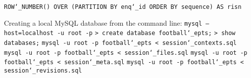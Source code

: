 \texttt{ROW\char`_NUMBER() OVER (PARTITION BY enq\char`_id ORDER BY sequence) AS risn}

\vspace{\baselineskip}
Creating a local MySQL database from the command line:\newline
\texttt{mysql --host=localhost -u root -p}\newline
\texttt{> create database football\char`_epts;}\newline
\texttt{> show databases;}\newline\newline
\texttt{mysql -u root -p football\char`_epts < session\char`_contexts.sql}\newline
\texttt{mysql -u root -p football\char`_epts < session\char`_files.sql}\newline
\texttt{mysql -u root -p football\char`_epts < session\char`_meta.sql}\newline
\texttt{mysql -u root -p football\char`_epts < session\char`_revisions.sql}\newline

\newpage